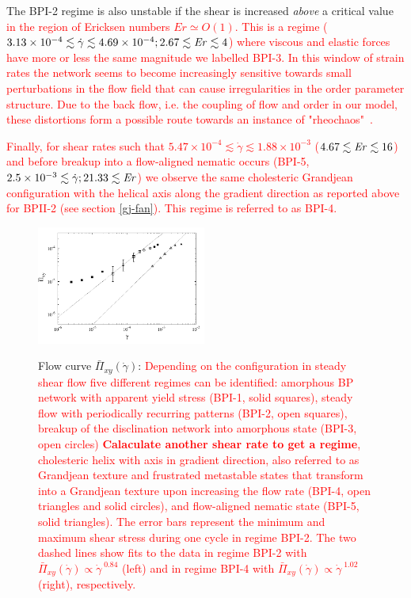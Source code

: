 \documentclass[8.5pt,twoside,twocolumn]{article}
\newcommand{\e}[1]{\times10^{#1}}
\newcommand{\gd}{\dot{\gamma}}
\newcommand{\com}[1]{{\bf {#1}}}
\newcommand{\rev}[1]{{\textcolor{red}{#1}}}
\begin{document}
The BPI-2 regime is also unstable if the shear is increased {\em above} 
a critical value 
\rev{
in the region of Ericksen numbers $Er \simeq O(1)$.
This is a regime 
($3.13\e{-4}\lesssim\gd\lesssim 4.69\e{-4}; 2.67\lesssim {\it Er} \lesssim 4$) 
where viscous and elastic forces have more or less 
the same magnitude we labelled BPI-3. 
In this window of strain rates the network seems to become
increasingly sensitive towards small perturbations in the flow field
that can cause irregularities in the order parameter structure.
Due to the back flow, i.e. the coupling of flow and order in our model, 
these distortions form a possible route towards an instance of 
"rheochaos"~\cite{rheochaos,Cates:2002}.
}

\rev{
Finally, for shear rates such that
$5.47\e{-4}\lesssim\gd\lesssim1.88\e{-3}$ ($4.67\lesssim {\it Er} \lesssim 16$) 
and before breakup into a flow-aligned nematic occurs 
(BPI-5, $2.5\e{-3}\lesssim\gd; 21.33\lesssim {\it Er}$) 
we observe the same cholesteric Grandjean configuration with the 
helical axis along the gradient direction as 
reported above for BPII-2 (see
section \ref{gj-fan}). This regime is referred to as BPI-4.
}
 
\begin{figure}[htpb]
\includegraphics[width=0.495\textwidth]{flowcurve_bp1.pdf}\\
\caption{Flow curve $\bar{\Pi}_{xy}(\gd)$: 
\rev{
Depending on the configuration in steady shear flow five different regimes 
can be identified: amorphous BP network with apparent yield stress (BPI-1, solid squares), 
steady flow with periodically recurring patterns (BPI-2, open squares), 
breakup of the disclination network into amorphous state (BPI-3, open circles)
\com{Calaculate another shear rate to get a regime},
cholesteric helix with axis in gradient direction, also referred to
as Grandjean texture and frustrated metastable states that transform into 
a Grandjean texture upon increasing the flow rate (BPI-4, open triangles and solid circles),
and flow-aligned nematic state (BPI-5, solid triangles). 
The error bars represent the minimum and maximum shear stress 
during one cycle in regime BPI-2.
The two dashed lines show fits to the data in regime BPI-2 with 
$\bar{\Pi}_{xy}(\gd)\propto \gd^{\;0.84}$ (left) 
and in regime BPI-4 with 
$\bar{\Pi}_{xy}(\gd)\propto \gd^{\;1.02}$ (right), respectively.}
}
\label{bp1-flowcurve}
\end{figure}
\end{document}
